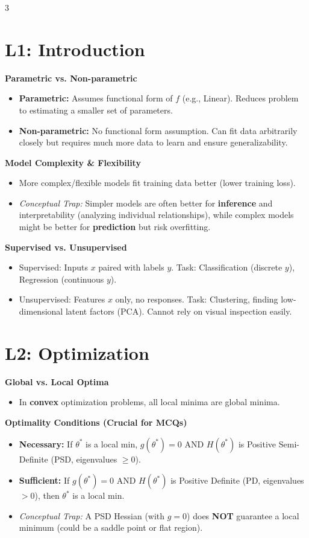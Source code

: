 \documentclass[10pt,landscape]{article}
\begin{document}
\begin{multicols*}{3}
\section{L1: Introduction}
\textbf{Parametric vs. Non-parametric}
\begin{itemize}
    \item \textbf{Parametric:} Assumes functional form of $f$ (e.g., Linear). Reduces problem to estimating a smaller set of parameters.
    \item \textbf{Non-parametric:} No functional form assumption. Can fit data arbitrarily closely but requires much more data to learn and ensure generalizability.
\end{itemize}

\textbf{Model Complexity \& Flexibility}
\begin{itemize}
    \item More complex/flexible models fit training data better (lower training loss).
    \item \textit{Conceptual Trap:} Simpler models are often better for \textbf{inference} and interpretability (analyzing individual relationships), while complex models might be better for \textbf{prediction} but risk overfitting.
\end{itemize}

\textbf{Supervised vs. Unsupervised}
\begin{itemize}
    \item Supervised: Inputs $x$ paired with labels $y$. Task: Classification (discrete $y$), Regression (continuous $y$).
    \item Unsupervised: Features $x$ only, no responses. Task: Clustering, finding low-dimensional latent factors (PCA). Cannot rely on visual inspection easily.
\end{itemize}

\section{L2: Optimization}
\textbf{Global vs. Local Optima}
\begin{itemize}
    \item In \textbf{convex} optimization problems, all local minima are global minima.
\end{itemize}

\textbf{Optimality Conditions (Crucial for MCQs)}
\begin{itemize}
    \item \textbf{Necessary:} If $\theta^*$ is a local min, $g(\theta^*) = 0$ AND $H(\theta^*)$ is Positive Semi-Definite (PSD, eigenvalues $\ge 0$).
    \item \textbf{Sufficient:} If $g(\theta^*) = 0$ AND $H(\theta^*)$ is Positive Definite (PD, eigenvalues $> 0$), then $\theta^*$ is a local min.
    \item \textit{Conceptual Trap:} A PSD Hessian (with $g=0$) does \textbf{NOT} guarantee a local minimum (could be a saddle point or flat region).
\end{itemize}


\end{multicols*}
\end{document}
